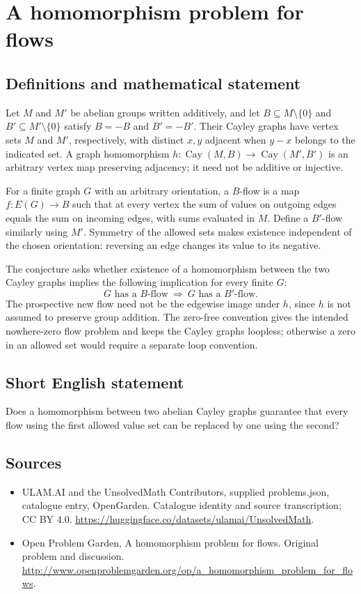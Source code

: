 \documentclass[11pt,a4paper]{article}
\begin{document}
\section*{A homomorphism problem for flows}\label{statement}

\subsection{Definitions and mathematical statement}
Let $M$ and $M'$ be abelian groups written additively, and let $B\subseteq M\setminus\{0\}$ and $B'\subseteq M'\setminus\{0\}$ satisfy $B=-B$ and $B'=-B'$. Their Cayley graphs have vertex sets $M$ and $M'$, respectively, with distinct $x,y$ adjacent when $y-x$ belongs to the indicated set. A graph homomorphism $h:\operatorname{Cay}(M,B)\to\operatorname{Cay}(M',B')$ is an arbitrary vertex map preserving adjacency; it need not be additive or injective.

For a finite graph $G$ with an arbitrary orientation, a $B$-flow is a map $f:E(G)\to B$ such that at every vertex the sum of values on outgoing edges equals the sum on incoming edges, with sums evaluated in $M$. Define a $B'$-flow similarly using $M'$. Symmetry of the allowed sets makes existence independent of the chosen orientation: reversing an edge changes its value to its negative.

The conjecture asks whether existence of a homomorphism between the two Cayley graphs implies the following implication for every finite $G$:
\[
       G\text{ has a }B\text{-flow}
       \ \Longrightarrow\ G\text{ has a }B'\text{-flow}.
\]
The prospective new flow need not be the edgewise image under $h$, since $h$ is not assumed to preserve group addition. The zero-free convention gives the intended nowhere-zero flow problem and keeps the Cayley graphs loopless; otherwise a zero in an allowed set would require a separate loop convention.
\subsection{Short English statement}
Does a homomorphism between two abelian Cayley graphs guarantee that every flow using the first allowed value set can be replaced by one using the second?
\subsection{Sources}
\begin{itemize}
\item[S1] ULAM.AI and the UnsolvedMath Contributors, supplied problems.json, catalogue entry, OpenGarden. Catalogue identity and source transcription; CC BY 4.0.
\url{https://huggingface.co/datasets/ulamai/UnsolvedMath}.
\item[S2] Open Problem Garden, A homomorphism problem for flows. Original problem and discussion.
\url{http://www.openproblemgarden.org/op/a_homomorphism_problem_for_flows}.
\end{itemize}
\end{document}
